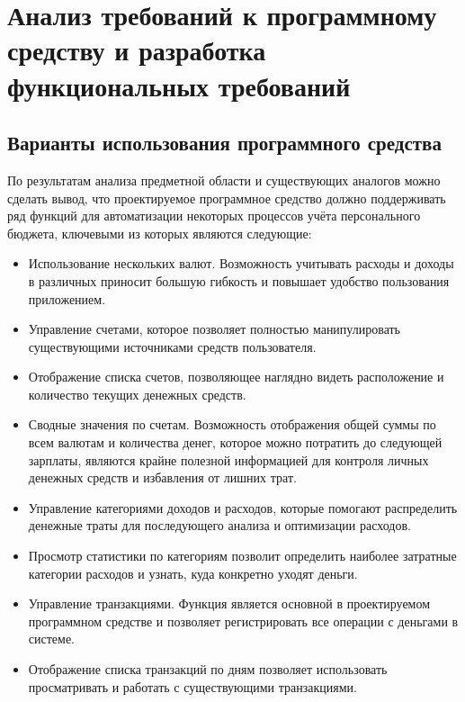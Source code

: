 \section{Анализ требований к программному средству и разработка функциональных требований}
\label{sec:domain}

\subsection{Варианты использования программного средства}
\label{sec:domain:use_cases}

По результатам анализа предметной области и существующих аналогов можно сделать вывод, что проектируемое программное средство должно поддерживать ряд функций для автоматизации некоторых процессов учёта персонального бюджета, ключевыми из которых являются следующие:

\begin{itemize}
    \item Использование нескольких валют.
    Возможность учитывать расходы и доходы в различных приносит большую гибкость и повышает удобство пользования приложением.
    \item Управление счетами, которое позволяет полностью манипулировать существующими источниками средств пользователя.
    \item Отображение списка счетов, позволяющее наглядно видеть расположение и количество текущих денежных средств.
    \item Сводные значения по счетам.
    Возможность отображения общей суммы по всем валютам и количества денег, которое можно потратить до следующей зарплаты, являются крайне полезной информацией для контроля личных денежных средств и избавления от лишних трат.
    \item Управление категориями доходов и расходов, которые помогают распределить денежные траты для последующего анализа и оптимизации расходов.
    \item Просмотр статистики по категориям позволит определить наиболее затратные категории расходов и узнать, куда конкретно уходят деньги.
    \item Управление транзакциями.
    Функция является основной в проектируемом программном средстве и позволяет регистрировать все операции с деньгами в системе.
    \item Отображение списка транзакций по дням позволяет использовать просматривать и работать с существующими транзакциями.
\end{itemize}

